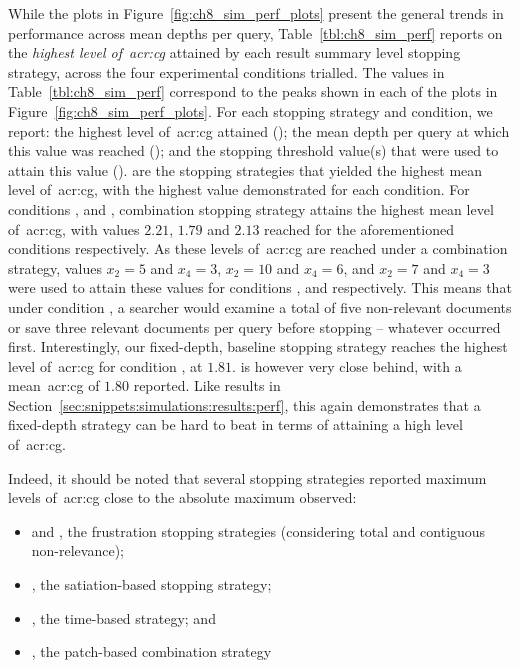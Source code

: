 While the plots in Figure~\ref{fig:ch8_sim_perf_plots} present the general trends in performance across mean depths per query, Table~\ref{tbl:ch8_sim_perf} reports on the \emph{highest level of~\gls{acr:cg}} attained by each result summary level stopping strategy, across the four experimental conditions trialled. The values in Table~\ref{tbl:ch8_sim_perf} correspond to the peaks shown in each of the plots in Figure~\ref{fig:ch8_sim_perf_plots}. For each stopping strategy and condition, we report: the highest level of~\gls{acr:cg} attained (); the mean depth per query at which this value was reached (); and the stopping threshold value(s) that were used to attain this value ().  are the stopping strategies that yielded the highest mean level of~\gls{acr:cg}, with the highest value demonstrated for each condition. For conditions ,  and , combination stopping strategy  attains the highest mean level of~\gls{acr:cg}, with values $2.21$, $1.79$ and $2.13$ reached for the aforementioned conditions respectively. As these levels of~\gls{acr:cg} are reached under a combination strategy, values $x_2=5$ and $x_4=3$, $x_2=10$ and $x_4=6$, and $x_2=7$ and $x_4=3$ were used to attain these values for conditions ,  and  respectively. This means that under condition , a searcher would examine a total of five non-relevant documents or save three relevant documents per query before stopping -- whatever occurred first. Interestingly, our fixed-depth, baseline stopping strategy  reaches the highest level of~\gls{acr:cg} for condition , at $1.81$.  is however very close behind, with a mean~\gls{acr:cg} of $1.80$ reported. Like results in Section~\ref{sec:snippets:simulations:results:perf}, this again demonstrates that a fixed-depth strategy can be hard to beat in terms of attaining a high level of~\gls{acr:cg}.

Indeed, it should be noted that several stopping strategies reported maximum levels of~\gls{acr:cg} close to the absolute maximum observed:

\begin{itemize}
    
    \item{ and , the frustration stopping strategies (considering total and contiguous non-relevance);}
    \item{, the satiation-based stopping strategy;}
    \item{, the time-based strategy; and}
    \item{, the patch-based combination strategy}
    
\end{itemize}

